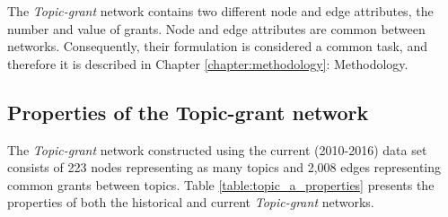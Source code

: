 The \textit{Topic-grant} network contains two different node and edge attributes, the number and value of grants. Node and edge attributes are common between networks. Consequently, their formulation is considered a common task, and therefore it is described in Chapter \ref{chapter:methodology}: Methodology.

\subsection{Properties of the Topic-grant network}

The \textit{Topic-grant} network constructed using the current (2010-2016) data set consists of 223 nodes representing as many topics and 2,008 edges representing common grants between topics. Table \ref{table:topic_a_properties} presents the properties of both the historical and current \textit{Topic-grant} networks.

